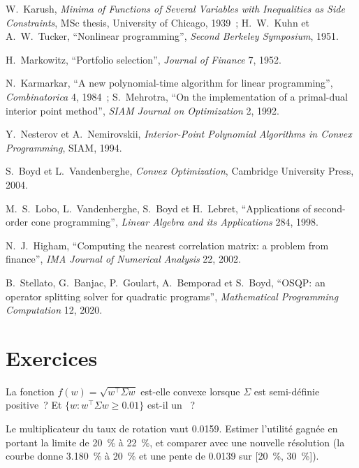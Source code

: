 \begin{omsources}
\item W.~Karush, \emph{Minima of Functions of Several Variables with Inequalities as Side Constraints}, MSc thesis, University of Chicago, 1939~; H.~W.~Kuhn et A.~W.~Tucker, ``Nonlinear
programming'', \emph{Second Berkeley Symposium}, 1951.
\item H.~Markowitz, ``Portfolio selection'', \emph{Journal of Finance} 7, 1952.
\item N.~Karmarkar, ``A new polynomial-time algorithm for linear programming'', \emph{Combinatorica} 4, 1984~; S.~Mehrotra, ``On the implementation of a primal-dual interior point method'',
\emph{SIAM Journal on Optimization} 2, 1992.
\item Y.~Nesterov et A.~Nemirovskii, \emph{Interior-Point Polynomial Algorithms in Convex Programming}, SIAM, 1994.
\item S.~Boyd et L.~Vandenberghe, \emph{Convex Optimization}, Cambridge University Press, 2004.
\item M.~S.~Lobo, L.~Vandenberghe, S.~Boyd et H.~Lebret, ``Applications of second-order cone programming'', \emph{Linear Algebra and its Applications} 284, 1998.
\item N.~J.~Higham, ``Computing the nearest correlation matrix: a problem from finance'', \emph{IMA Journal of Numerical Analysis} 22, 2002.
\item B.~Stellato, G.~Banjac, P.~Goulart, A.~Bemporad et S.~Boyd, ``OSQP: an operator splitting solver for quadratic programs'', \emph{Mathematical Programming Computation} 12, 2020.
\end{omsources}

\section{Exercices}

\begin{exercise}[$\star$]\label{exo:qm:convex-optimisation:1}
La fonction $f(w) = \sqrt{w^\top\Sigma w}$ est-elle convexe lorsque $\Sigma$ est semi-définie positive~? Et $\{w: w^\top\Sigma w \ge 0.01\}$ est-il un ~?
\end{exercise}

\begin{exercise}[$\star$]\label{exo:qm:convex-optimisation:2}
Le multiplicateur du taux de rotation vaut 0.0159. Estimer l'utilité gagnée en portant la limite de 20~\% à 22~\%, et comparer avec une nouvelle résolution (la courbe donne 3.180~\% à 20~\% et une pente de 0.0139 sur
[20~\%, 30~\%]).
\end{exercise}

